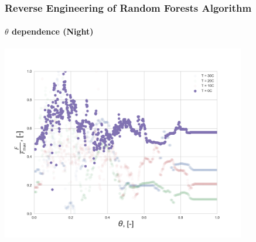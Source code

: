\documentclass{beamer}
\begin{document}
\begin{frame}
\frametitle{Reverse Engineering of Random Forests Algorithm}
\framesubtitle{$\theta$ dependence (Night)}

\centering
\includegraphics[width=0.8\textwidth]{Theta_dependence_0.png}

\end{frame}
\end{document}
